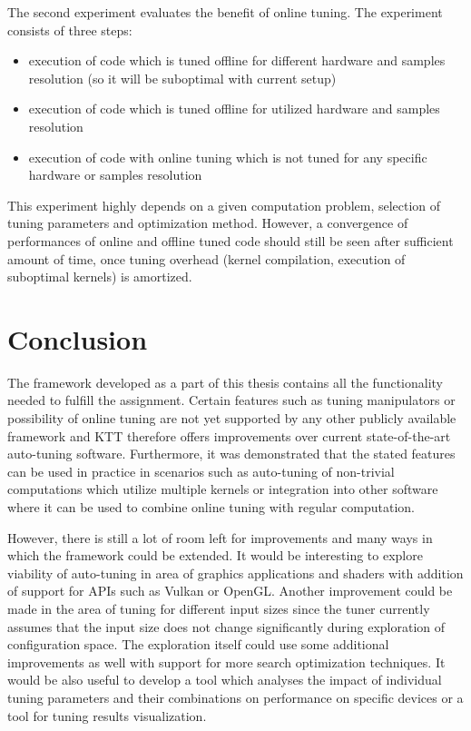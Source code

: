 \documentclass
[
    digital, %
    oneside, %
    table, %
    nolof, %
    nolot, %
    nocover %
]{fithesis3}
\begin{document}
The second experiment evaluates the benefit of online tuning. The experiment consists of three steps:
\begin{itemize}
    \item execution of code which is tuned offline for different hardware and samples resolution (so it will be suboptimal with current setup)
    \item execution of code which is tuned offline for utilized hardware and samples resolution
    \item execution of code with online tuning which is not tuned for any specific hardware or samples resolution
\end{itemize}
This experiment highly depends on a given computation problem, selection of tuning parameters and optimization method. However, a convergence of performances
of online and offline tuned code should still be seen after sufficient amount of time, once tuning overhead (kernel compilation, execution of suboptimal
kernels) is amortized.

\FloatBarrier

\chapter{Conclusion}
The framework developed as a part of this thesis contains all the functionality needed to fulfill the assignment. Certain features such as tuning
manipulators or possibility of online tuning are not yet supported by any other publicly available framework and KTT therefore offers improvements
over current state-of-the-art auto-tuning software. Furthermore, it was demonstrated that the stated features can be used in practice in scenarios
such as auto-tuning of non-trivial computations which utilize multiple kernels or integration into other software where it can be used to combine
online tuning with regular computation.

However, there is still a lot of room left for improvements and many ways in which the framework could be extended. It would be interesting to explore
viability of auto-tuning in area of graphics applications and shaders with addition of support for APIs such as Vulkan or OpenGL. Another improvement
could be made in the area of tuning for different input sizes since the tuner currently assumes that the input size does not change significantly during
exploration of configuration space. The exploration itself could use some additional improvements as well with support for more search optimization
techniques. It would be also useful to develop a tool which analyses the impact of individual tuning parameters and their combinations on performance on
specific devices or a tool for tuning results visualization.
\end{document}
